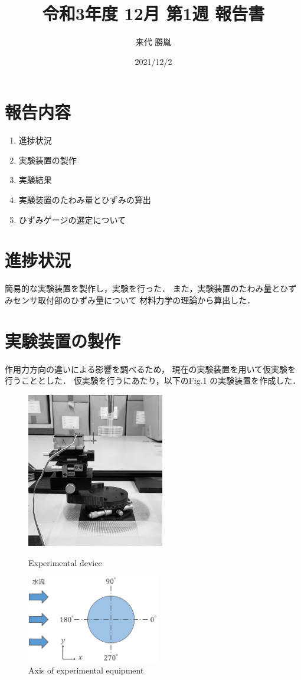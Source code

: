 \documentclass[twocolumn,a4j]{jsarticle}
\author{来代 勝胤}
\title{令和3年度 12月 第1週 報告書}
\date{2021/12/2}
\begin{document}
\columnseprule=0.1mm

\maketitle
\section*{報告内容}
\begin{enumerate}[1.]
    \item 進捗状況
    \item 実験装置の製作
    \item 実験結果
    \item 実験装置のたわみ量とひずみの算出
    \item ひずみゲージの選定について
\end{enumerate}

\section{進捗状況}
簡易的な実験装置を製作し，実験を行った．
また，実験装置のたわみ量とひずみセンサ取付部のひずみ量について
材料力学の理論から算出した．

\section{実験装置の製作}
作用力方向の違いによる影響を調べるため，
現在の実験装置を用いて仮実験を行うこととした．
仮実験を行うにあたり，以下のFig.1 の実験装置を作成した．
\begin{figure}[htbp]
    \footnotesize
    \begin{center}
        \includegraphics[width=60mm]{../images/device_gray.jpg}
        \caption{Experimental device}
        \includegraphics[width=58mm]{../../2111/images/model_1.png}
        \caption{Axis of experimental equipment}
    \end{center}
\end{figure}
\end{document}

